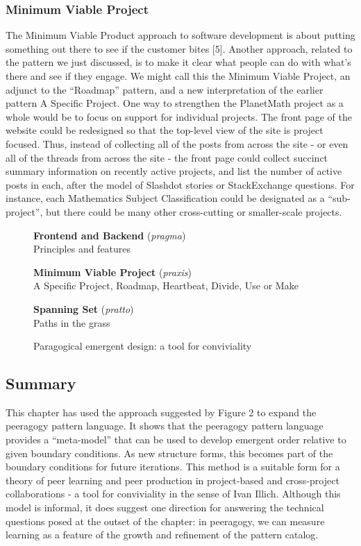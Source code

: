 \subsubsection{Minimum Viable Project}

The Minimum Viable Product approach to software development is about
putting something out there to see if the customer bites {[}5{]}.
Another approach, related to the pattern we just discussed, is to make
it clear what people can do with what's there and see if they engage. We
might call this the Minimum Viable Project, an adjunct to the
``Roadmap'' pattern, and a new interpretation of the earlier pattern A
Specific Project. One way to strengthen the PlanetMath project as a
whole would be to focus on support for individual projects. The front
page of the website could be redesigned so that the top-level view of
the site is project focused. Thus, instead of collecting all of the
posts from across the site - or even all of the threads from across the
site - the front page could collect succinct summary information on
recently active projects, and list the number of active posts in each,
after the model of Slashdot stories or StackExchange questions. For
instance, each Mathematics Subject Classification could be designated as
a ``sub-project'', but there could be many other cross-cutting or
smaller-scale projects.

\begin{figure}[h]
\begin{center}
\textbf{Frontend and Backend} (\emph{pragma}) \\ Principles and features

\medskip
\textbf{Minimum Viable Project} (\emph{praxis}) \\ A Specific Project,
Roadmap, Heartbeat, Divide, Use or Make

\medskip
\textbf{Spanning Set} (\emph{pratto}) \\ Paths in the grass
\end{center}
\caption*{Paragogical emergent design: a tool for conviviality}
\end{figure}

\subsection{Summary}

This chapter has used the approach suggested by Figure 2 to expand the
peeragogy pattern language. It shows that the peeragogy pattern language
provides a ``meta-model'' that can be used to develop emergent order
relative to given boundary conditions. As new structure forms, this
becomes part of the boundary conditions for future iterations. This
method is a suitable form for a theory of peer learning and peer
production in project-based and cross-project collaborations - a tool
for conviviality in the sense of Ivan Illich. Although this model is
informal, it does suggest one direction for answering the technical
questions posed at the outset of the chapter: in peeragogy, we can
measure learning as a feature of the growth and refinement of the
pattern catalog.


